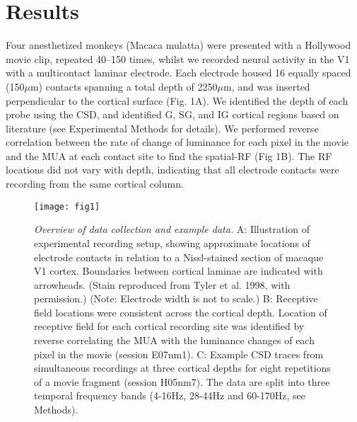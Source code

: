 \section{Results}
Four anesthetized monkeys (Macaca mulatta) were presented with a Hollywood movie clip, repeated 40--150 times, whilst we recorded neural activity in the \ac{V1} with a multicontact laminar electrode. Each electrode housed 16 equally spaced (150\hspace{0.2em}$\mu$m) contacts spanning a total depth of 2250\hspace{0.2em}$\mu$m, and was inserted perpendicular to the cortical surface (Fig. 1A). We identified the depth of each probe using the \ac{CSD}, and identified \ac{G}, \ac{SG}, and \ac{IG} cortical regions based on literature (see Experimental Methods for details). We performed reverse correlation between the rate of change of luminance for each pixel in the movie and the \ac{MUA} at each contact site to find the spatial-\ac{RF} (Fig 1B). The \ac{RF} locations did not vary with depth, indicating that all electrode contacts were recording from the same cortical column.

\begin{figure}[htbp]
\centering \texttt{[image: fig1]}
%
\caption{%
\textit{Overview of data collection and example data.}
A: Illustration of experimental recording setup, showing approximate locations 
of electrode contacts in relation to a Nissl-stained section of macaque \ac{V1} 
cortex. Boundaries between cortical laminae are indicated with arrowheads. 
(Stain reproduced from Tyler et al. 1998, with permission.) (Note: Electrode 
width is not to scale.)
B: Receptive field locations were consistent across the 
cortical depth. Location of receptive field for each cortical recording site 
was identified by reverse 
correlating the \ac{MUA} with the luminance changes of each 
pixel in the movie (session E07nm1).
C: Example \ac{CSD} traces from simultaneous recordings at three cortical depths for eight 
repetitions of a movie fragment (session H05nm7).
The data are split into three temporal frequency bands (4-16Hz, 
28-44Hz and 60-170Hz, see Methods).}%
\label{fig:lam_1}
%
\end{figure}

